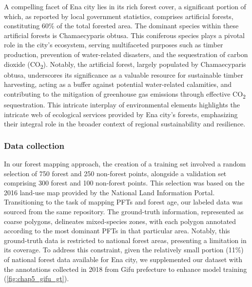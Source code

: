A compelling facet of Ena city lies in its rich forest cover, a significant portion of which, as reported by local government statistics, comprises artificial forests, constituting 60\% of the total forested area. The dominant species within these artificial forests is Chamaecyparis obtusa. This coniferous species plays a pivotal role in the city's ecosystem, serving multifaceted purposes such as timber production, prevention of water-related disasters, and the sequestration of carbon dioxide (CO\textsubscript{2}). Notably, the artificial forest, largely populated by Chamaecyparis obtusa, underscores its significance as a valuable resource for sustainable timber harvesting, acting as a buffer against potential water-related calamities, and contributing to the mitigation of greenhouse gas emissions through effective CO\textsubscript{2} sequestration. This intricate interplay of environmental elements highlights the intricate web of ecological services provided by Ena city's forests, emphasizing their integral role in the broader context of regional sustainability and resilience. \par

\subsubsection*{Data collection}
In our forest mapping approach, the creation of a training set involved a random selection of 750 forest and 250 non-forest points, alongside a validation set comprising 300 forest and 100 non-forest points. This selection was based on the 2016 land-use map provided by the National Land Information Portal. Transitioning to the task of mapping PFTs and forest age, our labeled data was sourced from the same repository. The ground-truth information, represented as coarse polygons, delineates mixed-species zones, with each polygon annotated according to the most dominant PFTs in that particular area. Notably, this ground-truth data is restricted to national forest areas, presenting a limitation in its coverage. To address this constraint, given the relatively small portion (11\%) of national forest data available for Ena city, we supplemented our dataset with the annotations collected in 2018 from Gifu prefecture to enhance model training (\ref{fig:chap5_gifu_gt}). \par


